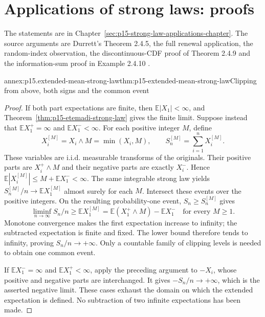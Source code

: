 \section{Applications of strong laws: proofs}
\label{sec:annex-p15-strong-law-applications}

The statements are in Chapter~\ref{sec:p15-strong-law-applications-chapter}.
The source arguments are Durrett's Theorem 2.4.5, the full renewal
application, the random-index observation, the discontinuous-CDF proof
of Theorem 2.4.9 and the information-sum proof in Example 2.4.10
\cite[pp.~78--80]{DurrettPTEAuthor2019}.

\begin{annexitem}{annex:p15.extended-mean-strong-law}{thm:p15-extended-mean-strong-law}{Clipping from above, both signs and the common event}
\begin{proof}
If both part expectations are finite, then \(\mathbb E|X_1|<\infty\),
and Theorem~\ref{thm:p15-etemadi-strong-law} gives the finite
limit. Suppose instead that \(\mathbb EX_1^+=\infty\) and
\(\mathbb EX_1^-<\infty\). For each positive integer \(M\), define
\[
 X_i^{[M]}=X_i\wedge M=\min(X_i,M),\qquad
 S_n^{[M]}=\sum_{i=1}^nX_i^{[M]}.
\]
These variables are i.i.d. measurable transforms of the originals.
Their positive parts are \(X_i^+\wedge M\) and their negative
parts are exactly \(X_i^-\). Hence
\(\mathbb E|X_i^{[M]}|\leq M+\mathbb EX_1^-<\infty\).
The same integrable strong law yields
\(S_n^{[M]}/n\to\mathbb EX_1^{[M]}\) almost surely for each \(M\).
Intersect these events over the positive integers. On the resulting
probability-one event, \(S_n\geq S_n^{[M]}\) gives
\[
 \liminf_{n\to\infty}S_n/n\geq\mathbb EX_1^{[M]}
             =\mathbb E(X_1^+\wedge M)-\mathbb EX_1^-
                         \quad\text{for every }M\geq1.
\]
Monotone convergence makes the first expectation increase to infinity;
the subtracted expectation is finite and fixed. The lower bound
therefore tends to infinity, proving \(S_n/n\to+\infty\).
Only a countable family of clipping levels is needed to obtain one
common event.

If \(\mathbb EX_1^-=\infty\) and \(\mathbb EX_1^+<\infty\),
apply the preceding argument to \(-X_i\), whose positive and negative
parts are interchanged. It gives \(-S_n/n\to+\infty\), which is
the asserted negative limit. These cases exhaust the domain on which
the extended expectation is defined. No subtraction of two infinite
expectations has been made.
\end{proof}
\end{annexitem}


